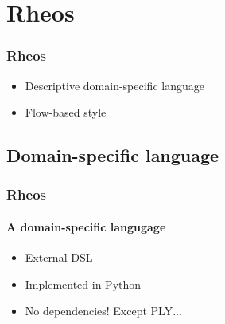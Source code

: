 \section{Rheos}

\begin{frame}
\frametitle{Rheos}

\begin{itemize}
\pause
\item Descriptive domain-specific language
\pause
\item Flow-based style
\end{itemize}
\end{frame}


\subsection*{Domain-specific language}
\begin{frame}
\frametitle{Rheos}
\framesubtitle{A domain-specific langugage}

\begin{itemize}
\pause
\item External DSL
\pause
\item Implemented in Python
\pause
\item No dependencies! Except PLY...
\end{itemize}

\end{frame}




